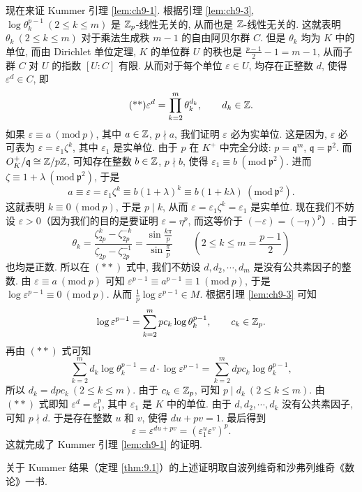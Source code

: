 现在来证 Kummer 引理 \ref{lem:ch9-1}. 根据引理 \ref{lem:ch9-3}, $\log\theta_k^{p-1}\ (2\leqslant k\leqslant m)$ 是 $\mathbb{Z}_p$-线性无关的, 从而也是 $\mathbb{Z}$-线性无关的. 这就表明 $\theta_k\ (2\leqslant k\leqslant m)$ 对于乘法生成秩 $m-1$ 的自由阿贝尔群 $C$. 但是 $\theta_k$ 均为 $K$ 中的单位, 而由 Dirichlet 单位定理, $K$ 的单位群 $U$ 的秩也是 $\frac{p-1}{2}-1=m-1$, 从而子群 $C$ 对 $U$ 的指数 $[U:C]$ 有限. 从而对于每个单位 $\varepsilon\in U$, 均存在正整数 $d$, 使得 $\varepsilon^d\in C$, 即
\begin{equation}\tag{**}
  \varepsilon^d=\prod_{k=2}^{m}\theta_k^{d_k},\qquad d_k\in\mathbb{Z}.
\end{equation}
如果 $\varepsilon\equiv a\ (\mathrm{mod}\ p)$, 其中 $a\in\mathbb{Z}$, $p\nmid a$, 我们证明 $\varepsilon$ 必为实单位. 这是因为, $\varepsilon$ 必可表为 $\varepsilon=\varepsilon_1\zeta^k$, 其中 $\varepsilon_1$ 是实单位. 由于 $p$ 在 $K^+$ 中完全分歧: $p=\mathfrak{q}^m$, $\mathfrak{q}=\mathfrak{p}^2$. 而 $O_K^+/\mathfrak{q}\cong\mathbb{Z}/p\mathbb{Z}$, 可知存在整数 $b\in\mathbb{Z}$, $p\nmid b$, 使得 $\varepsilon_1\equiv b\ (\mathrm{mod}\ \mathfrak{p}^2)$. 进而 $\zeta\equiv 1+\lambda\ (\mathrm{mod}\ \mathfrak{p}^2)$, 于是
\[
  a\equiv\varepsilon=\varepsilon_1\zeta^k\equiv b(1+\lambda)^k
  \equiv b(1+k\lambda)\ (\mathrm{mod}\ \mathfrak{p}^2).
\]
这就表明 $k\equiv 0\ (\mathrm{mod}\ p)$, 于是 $p\mid k$, 从而 $\varepsilon=\varepsilon_1\zeta^k=\varepsilon_1$ 是实单位. 现在我们不妨设 $\varepsilon>0$（因为我们的目的是要证明 $\varepsilon=\eta^p$, 而这等价于 $(-\varepsilon)=(-\eta)^p$）. 由于
\[
  \theta_k=\frac{\zeta_{2p}^k-\zeta_{2p}^{-k}}{\zeta_{2p}-\zeta_{2p}^{-1}}
  =\frac{\sin\frac{k\pi}{p}}{\sin\frac{\pi}{p}}\qquad(2\leqslant k\leqslant m=\frac{p-1}{2})
\]
也均是正数. 所以在 $(**)$ 式中, 我们不妨设 $d,d_2,\cdots,d_m$ 是没有公共素因子的整数. 由 $\varepsilon\equiv a\ (\mathrm{mod}\ p)$ 可知 $\varepsilon^{p-1}\equiv a^{p-1}\equiv 1\ (\mathrm{mod}\ p)$, 于是 $\log\varepsilon^{p-1}\equiv 0\ (\mathrm{mod}\ p)$. 从而 $\frac{1}{p}\log\varepsilon^{p-1}\in M$. 根据引理 \ref{lem:ch9-3} 可知
\[
  \log\varepsilon^{p-1}=\sum_{k=2}^{m}pc_k\log\theta_k^{p-1},\qquad c_k\in\mathbb{Z}_p.
\]
再由 $(**)$ 式可知
\[
  \sum_{k=2}^{m}d_k\log\theta_k^{p-1}=d\cdot\log\varepsilon^{p-1}
  =\sum_{k=2}^{m}dpc_k\log\theta_k^{p-1},
\]
所以 $d_k=dpc_k\ (2\leqslant k\leqslant m)$. 由于 $c_k\in\mathbb{Z}_p$, 可知 $p\mid d_k\ (2\leqslant k\leqslant m)$. 由 $(**)$ 式即知 $\varepsilon^d=\varepsilon_1^p$, 其中 $\varepsilon_1$ 是 $K$ 中的单位. 由于 $d,d_2,\cdots,d_k$ 没有公共素因子, 可知 $p\nmid d$. 于是存在整数 $u$ 和 $v$, 使得 $du+pv=1$. 最后得到
\[
  \varepsilon=\varepsilon^{du+pv}=(\varepsilon_1^u\varepsilon^v)^p.
\]
这就完成了 Kummer 引理 \ref{lem:ch9-1} 的证明.

关于 Kummer 结果（定理 \ref{thm:9.1}）的上述证明取自波列维奇和沙弗列维奇《数论》一书.
